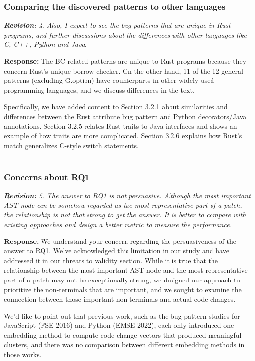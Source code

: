 \documentclass{article}
\begin{document}
\subsubsection{Comparing the discovered patterns to other languages}

\textit{\textbf{Revision:} 4. Also, I expect to see the bug patterns that are unique in Rust programs, and further discussions about the differences with other languages like C, C++, Python and Java. }

\textbf{Response:} The BC-related patterns are unique to Rust programs because they concern Rust's unique borrow checker. On the other hand, 11 of the 12 general patterns (excluding G.option) have counterparts in other widely-used programming languages, and we discuss differences in the text.

Specifically, we have added content to Section 3.2.1 about similarities and differences between the Rust attribute bug pattern and Python decorators/Java annotations. Section 3.2.5 relates Rust traits to Java interfaces and shows an example of how traits are more complicated. Section 3.2.6 explains how Rust's match generalizes C-style switch statements. \\ \\

\subsubsection{Concerns about RQ1}

\textit{\textbf{Revision:} 5. The answer to RQ1 is not persuasive. Although the most important AST node can be somehow regarded as the most representative part of a patch, the relationship is not that strong to get the answer. It is better to compare with existing approaches and design a better metric to measure the performance.}

\textbf{Response:} We understand your concern regarding the persuasiveness of the answer to RQ1. We've acknowledged this limitation in our study and have addressed it in our threats to validity section. While it is true that the relationship between the most important AST node and the most representative part of a patch may not be exceptionally strong, we designed our approach to prioritize the non-terminals that are important, and we sought to examine the connection between those important non-terminals and actual code changes.

We'd like to point out that previous work, such as the bug pattern studies for JavaScript (FSE 2016) and Python (EMSE 2022), each only introduced one embedding method to compute code change vectors that produced meaningful clusters, and there was no comparison between different embedding methods in those works.
\end{document}
